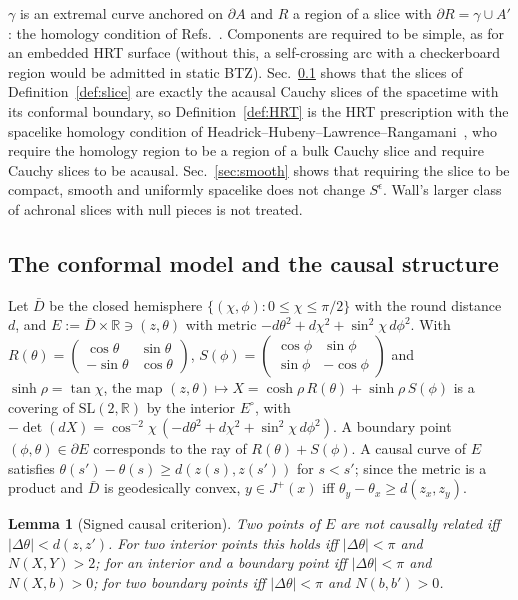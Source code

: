 \documentclass[aps,prd,onecolumn,superscriptaddress,nofootinbib,amsmath,amssymb,11pt]{revtex4-2}
\newtheorem{lemma}[theorem]{Lemma}
\theoremstyle{definition}
\newcommand{\R}{\mathbb{R}}
\newcommand{\SL}{\mathrm{SL}(2,\R)}
\newcommand{\eps}{\epsilon}
\begin{document}
$\gamma$ is an extremal curve anchored on $\partial A$ and $R$ a region of a slice with $\partial R=\gamma\cup A'$: the
homology condition of Refs.~\cite{HeadrickTakayanagi2007,Wall2014,HHLR2014}. Components are required to be simple, as for an
embedded HRT surface (without this, a self-crossing arc with a checkerboard region would be admitted in static BTZ).
Sec.~\ref{sec:causal} shows that the slices of Definition~\ref{def:slice} are exactly the acausal Cauchy slices of the
spacetime with its conformal boundary, so Definition~\ref{def:HRT} is the HRT prescription with the spacelike homology
condition of Headrick--Hubeny--Lawrence--Rangamani~\cite{HHLR2014}, who require the homology region to be a region of a
bulk Cauchy slice and require Cauchy slices to be acausal. Sec.~\ref{sec:smooth} shows that requiring the slice to be
compact, smooth and uniformly spacelike does not change $S^\eps$. Wall's larger class of achronal slices with null pieces
is not treated.

\subsection{The conformal model and the causal structure}\label{sec:causal}

Let $\bar D$ be the closed hemisphere $\{(\chi,\phi):0\le\chi\le\pi/2\}$ with the round distance $d$, and
$E:=\bar D\times\R\ni(z,\theta)$ with metric $-d\theta^2+d\chi^2+\sin^2\chi\,d\phi^2$. With
$R(\theta)=\begin{pmatrix}\cos\theta&\sin\theta\\-\sin\theta&\cos\theta\end{pmatrix}$,
$S(\phi)=\begin{pmatrix}\cos\phi&\sin\phi\\\sin\phi&-\cos\phi\end{pmatrix}$ and $\sinh\rho=\tan\chi$, the map
$(z,\theta)\mapsto X=\cosh\rho\,R(\theta)+\sinh\rho\,S(\phi)$ is a covering of $\SL$ by the interior $E^\circ$, with
$-\det(dX)=\cos^{-2}\chi\,(-d\theta^2+d\chi^2+\sin^2\chi\,d\phi^2)$. A boundary point $(\phi,\theta)\in\partial E$
corresponds to the ray of $R(\theta)+S(\phi)$. A causal curve of $E$ satisfies $\theta(s')-\theta(s)\ge d(z(s),z(s'))$ for
$s<s'$; since the metric is a product and $\bar D$ is geodesically convex, $y\in J^+(x)$ iff $\theta_y-\theta_x\ge d(z_x,z_y)$.

\begin{lemma}[Signed causal criterion]\label{lem:K}
Two points of $E$ are not causally related iff $|\Delta\theta|<d(z,z')$. For two interior points this holds iff
$|\Delta\theta|<\pi$ and $N(X,Y)>2$; for an interior and a boundary point iff $|\Delta\theta|<\pi$ and $N(X,b)>0$; for two
boundary points iff $|\Delta\theta|<\pi$ and $N(b,b')>0$.
\end{lemma}
\end{document}
